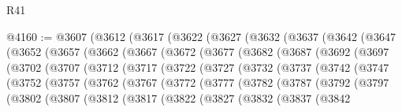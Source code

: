 \begin{lexlean}{R41}
\begin{coremodule}
@4160 := @3607
    (@3612
      (@3617
        (@3622
          (@3627
            (@3632
              (@3637
                (@3642
                  (@3647
                    (@3652
                      (@3657
                        (@3662
                          (@3667
                            (@3672
                              (@3677
                                (@3682
                                  (@3687
                                    (@3692
                                      (@3697
                                        (@3702
                                          (@3707
                                            (@3712
                                              (@3717
                                                (@3722
                                                  (@3727
                                                    (@3732
                                                      (@3737
                                                        (@3742
                                                          (@3747
                                                            (@3752
                                                              (@3757
                                                                (@3762
                                                                  (@3767
                                                                    (@3772
                                                                      (@3777
                                                                        (@3782
                                                                          (@3787
                                                                            (@3792
                                                                              (@3797
                                                                                (@3802
                                                                                  (@3807
                                                                                    (@3812
                                                                                      (@3817
                                                                                        (@3822
                                                                                          (@3827
                                                                                            (@3832
                                                                                              (@3837
                                                                                                (@3842

\end{coremodule}
\end{lexlean}
